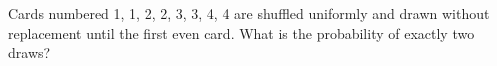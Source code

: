 Cards numbered 1, 1, 2, 2, 3, 3, 4, 4 are shuffled uniformly and drawn without replacement until the first even card. What is the probability of exactly two draws?
